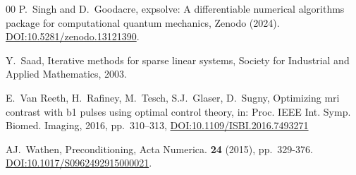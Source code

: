 \documentclass{article}
\begin{document}
\begin{thebibliography}{00}
P.~Singh and D.~Goodacre,
\newblock expsolve: A differentiable numerical algorithms package for computational quantum mechanics, 
\newblock Zenodo (2024). 
\href{https://doi.org/10.5281/zenodo.13121390}{DOI:10.5281/zenodo.13121390}.



Y.~Saad,
\newblock Iterative methods for sparse linear systems,
\newblock Society for Industrial and Applied Mathematics, 2003.


E.~Van Reeth, H.~Rafiney, M.~Tesch, S.J.~Glaser, D.~Sugny,
\newblock Optimizing mri contrast with b1 pulses using optimal control theory, 
\newblock in: Proc. IEEE Int. Symp. Biomed. Imaging, 2016, pp.~310–313, \href{https://doi.org/10.1109/ISBI.2016.7493271}{DOI:10.1109/ISBI.2016.7493271}


AJ.~Wathen,
\newblock Preconditioning,
\newblock Acta Numerica. \textbf{24} (2015), pp.~329-376. \href{https://doi.org/10.1017/S0962492915000021}{DOI:10.1017/S0962492915000021}.


\end{thebibliography}
\end{document}
